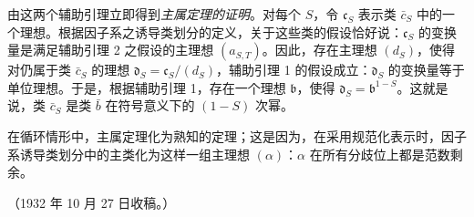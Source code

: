 \documentclass[11pt]{article}
\begin{document}
由这两个辅助引理立即得到\emph{主属定理的证明}。对每个 \(S\)，令 \(\mathfrak c_S\) 表示类 \(\bar c_S\) 中的一个理想。根据因子系之诱导类划分的定义，关于这些类的假设恰好说：\(\mathfrak c_S\) 的变换量是满足辅助引理 2 之假设的主理想 \((a_{S,T})\)。因此，存在主理想 \((d_S)\)，使得对仍属于类 \(\bar c_S\) 的理想 \(\mathfrak d_S=\mathfrak c_S/(d_S)\)，辅助引理 1 的假设成立：\(\mathfrak d_S\) 的变换量等于单位理想。于是，根据辅助引理 1，存在一个理想 \(\mathfrak b\)，使得 \(\mathfrak d_S=\mathfrak b^{1-S}\)。这就是说，类 \(\bar c_S\) 是类 \(\bar b\) 在符号意义下的 \((1-S)\) 次幂。

在循环情形中，主属定理化为熟知的定理；这是因为，在采用规范化表示时，因子系诱导类划分中的主类化为这样一组主理想 \((\alpha)\)：\(\alpha\) 在所有分歧位上都是范数剩余。

\begin{center}
（1932 年 10 月 27 日收稿。）
\end{center}
\end{document}
